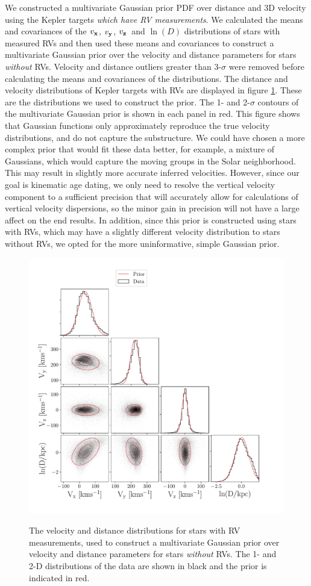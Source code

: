 \documentclass[]{aastex631}
\newcommand{\vx}{$v_{\bf x}$}
\newcommand{\vy}{$v_{\bf y}$}
\newcommand{\vz}{$v_{\bf z}$}
\begin{document}
We constructed a multivariate Gaussian prior PDF over distance and 3D velocity
using the Kepler targets {\it which have RV measurements}.
We calculated the means and covariances of the \vx, \vy, \vz\ and $\ln(D)$
distributions of stars with measured RVs and then used these means and
covariances to construct a multivariate Gaussian prior over the velocity and
distance parameters for stars {\it without} RVs.
Velocity and distance outliers greater than 3-$\sigma$ were removed before
calculating the means and covariances of the distributions.
The distance and velocity distributions of Kepler targets with RVs are
displayed in figure \ref{fig:prior_distributions_2D}.
These are the distributions we used to construct the prior.
The 1- and 2-$\sigma$ contours of the multivariate Gaussian prior is shown in
each panel in red.
This figure shows that Gaussian functions only approximately reproduce
the true velocity distributions, and do not capture the substructure.
We could have chosen a more complex prior that would fit these data better,
for example, a mixture of Gaussians, which would capture the moving groups in
the Solar neighborhood.
This may result in slightly more accurate inferred velocities.
However, since our goal is kinematic age dating, we only need to resolve the
vertical velocity component to a sufficient precision that will accurately
allow for calculations of vertical velocity dispersions, so the minor gain in
precision will not have a large affect on the end results.
In addition, since this prior is constructed using stars with RVs, which may
have a slightly different velocity distribution to stars without RVs, we opted
for the more uninformative, simple Gaussian prior.

\begin{figure}[ht!]
\caption{
The velocity and distance distributions for stars with RV measurements,
    used to construct a multivariate Gaussian prior over velocity and
    distance parameters for stars {\it without} RVs.
The 1- and 2-D distributions of the data are shown in black and the prior is
    indicated in red.
}
  \centering
    \includegraphics[width=.8\textwidth]{prior_distributions_2D}
\label{fig:prior_distributions_2D}
\end{figure}
\end{document}
